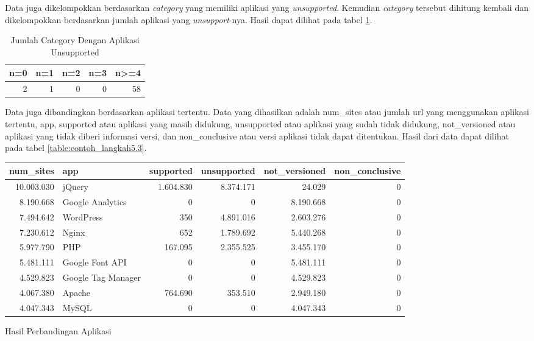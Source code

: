 Data juga dikelompokkan berdasarkan \textit{category} yang memiliki aplikasi yang \textit{unsupported}. Kemudian \textit{category} tersebut dihitung kembali dan dikelompokkan berdasarkan jumlah aplikasi yang \textit{unsupport}-nya. Hasil dapat dilihat pada tabel \ref{table:contoh_langkah5.2}.
\begin{table}[H]
\centering
\begin{tabular}{|r|r|r|r|r|}
	\hline
	\textbf{n=0} & \textbf{n=1} & \textbf{n=2} & \textbf{n=3} & \textbf{n>=4}\\
	\hline
	2 & 1 & 0 & 0 & 58\\
	\hline
\end{tabular}
\caption{Jumlah Category Dengan Aplikasi Unsupported}
\label{table:contoh_langkah5.2}
\end{table}

Data juga dibandingkan berdasarkan aplikasi tertentu. Data yang dihasilkan adalah num\_sites atau jumlah url yang menggunakan aplikasi tertentu, app, supported atau aplikasi yang masih didukung, unsupported atau aplikasi yang sudah tidak didukung, not\_versioned atau aplikasi yang tidak diberi informasi versi, dan non\_conclusive atau versi aplikasi tidak dapat ditentukan. Hasil dari data dapat dilihat pada tabel \ref{table:contoh_langkah5.3}.
\begin{adjustwidth}{-2.5 cm}{-2.5 cm}\centering\begin{threeparttable}[!htb]
	\begin{tabular}{|r|l|r|r|r|r|}
		\hline
		\textbf{num\_sites} & \textbf{app} & \textbf{supported} & \textbf{unsupported} & \textbf{not\_versioned} & \textbf{non\_conclusive}\\
		\hline
		10.003.030 &jQuery &1.604.830 &8.374.171 &24.029 &0 \\
		\hline
		8.190.668 &Google Analytics &0 &0 &8.190.668 &0 \\
		\hline
		7.494.642 &WordPress &350 &4.891.016 &2.603.276 &0 \\
		\hline
		7.230.612 &Nginx &652 &1.789.692 &5.440.268 &0 \\
		\hline
		5.977.790 &PHP &167.095 &2.355.525 &3.455.170 &0 \\
		\hline
		5.481.111 &Google Font API &0 &0 &5.481.111 &0 \\
		\hline
		4.529.823 &Google Tag Manager &0 &0 &4.529.823 &0 \\
		\hline
		4.067.380 &Apache &764.690 &353.510 &2.949.180 &0 \\
		\hline
		4.047.343 &MySQL &0 &0 &4.047.343 &0 \\
		\hline
	\end{tabular}
	\caption{Hasil Perbandingan Aplikasi}
	\label{table:contoh_langkah5.3}
\end{threeparttable}\end{adjustwidth}


